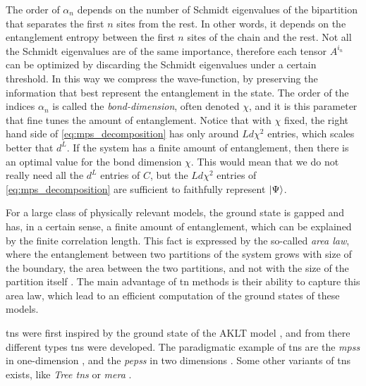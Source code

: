The order of $\alpha_n$ depends on the number of Schmidt eigenvalues of the bipartition that separates the first $n$ sites from the rest.
In other words, it depends on the entanglement entropy between the first $n$ sites of the chain and the rest.
Not all the Schmidt eigenvalues are of the same importance, therefore each tensor $A^{i_n}$ can be optimized by discarding the Schmidt eigenvalues under a certain threshold.
In this way we compress the wave-function, by preserving the information that best represent the entanglement in the state.
The order of the indices $\alpha_n$ is called the \emph{bond-dimension}, often denoted $\chi$, and it is this parameter that fine tunes the amount of entanglement.
Notice that with $\chi$ fixed, the right hand side of \eqref{eq:mps_decomposition} has only around $L d \chi^2$ entries, which scales better that $d^L$.
If the system has a finite amount of entanglement, then there is an optimal value for the bond dimension $\chi$.
This would mean that we do not really need all the $d^L$ entries of $C$, but the $L d \chi^2$ entries of \eqref{eq:mps_decomposition} are sufficient to faithfully represent $\ket{\Psi}$.

For a large class of physically relevant models, the ground state is gapped and has, in a certain sense, a finite amount of entanglement, which can be explained by the finite correlation length.
This fact is expressed by the so-called \emph{area law}, where the entanglement between two partitions of the system grows with size of the boundary, the area between the two partitions, and not with the size of the partition itself \cite{vidal2003arealaw, calabrese2004qft, srednicki1993area, plenio2005area}.
The main advantage of \ac{tn} methods is their ability to capture this area law, which lead to an efficient computation of the ground states of these models.

\Acp{tn} were first inspired by the ground state of the AKLT model \cite{affleck1987aklt}, and from there different types \acp{tn} were developed.
The paradigmatic example of \acp{tn} are the \emph{\acp{mps}} in one-dimension \cite{vidal2008simulation, schollwock2011dmrg}, and the \emph{\acp{peps}} in two dimensions \cite{verstraete2004algo, jordan2008ipeps}.
Some other variants of \acp{tn} exists, like \emph{Tree \acp{tn}} \cite{tagliacozzo2009tree, fannes1992trees} or \emph{\ac{mera}} \cite{evenbly2013mera, vidal2007entanglement, evenbly2009entanglement}.


